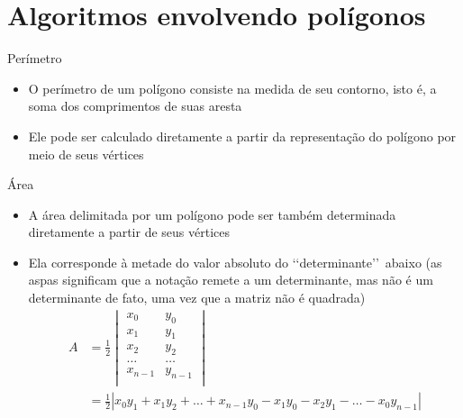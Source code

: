 \section{Algoritmos envolvendo polígonos}

\begin{frame}[fragile]{Perímetro}

    \begin{itemize}
        \item O perímetro de um polígono consiste na medida de seu contorno, isto é, a soma dos 
            comprimentos de suas aresta
        \pause

        \item Ele pode ser calculado diretamente a partir da representação do polígono por meio
            de seus vértices
        \pause
    \end{itemize}

\end{frame}

\begin{frame}[fragile]{Área}

    \begin{itemize}
        \item A área delimitada por um polígono pode ser também determinada diretamente a partir
            de seus vértices
        \pause

        \item Ela corresponde à metade do valor absoluto do \lq \lq determinante\rq\rq\ abaixo (as 
            aspas significam que a notação remete a um determinante, mas não é um determinante de 
                fato, uma vez que a matriz não é quadrada)
        \begin{align*}
            A &= \frac{1}{2}\begin{vmatrix}
                x_0 & y_0 \\
                x_1 & y_1 \\
                x_2 & y_2 \\
                \ldots & \ldots \\
                x_{n-1} & y_{n-1} \\
            \end{vmatrix} \\
            & = \frac{1}{2}|x_0y_1 + x_1y_2 + \ldots + x_{n-1}y_0 - x_1y_0 - x_2y_1 - \ldots - x_0y_{n-1}|
        \end{align*}
    \end{itemize}

\end{frame}

